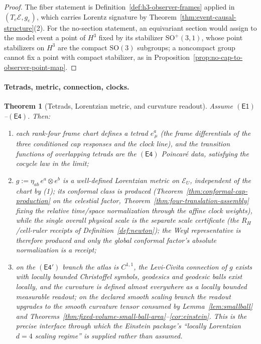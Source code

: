 \documentclass[11pt]{article}
\newtheorem{theorem}{Theorem}[section]
\begin{document}
\begin{proof}
The fiber statement is Definition~\ref{def:h3-observer-frames} applied in
\((T_e\mathcal E,g_e)\), which carries Lorentz signature by
Theorem~\ref{thm:event-causal-structure}(2). For the no-section statement,
an equivariant section would assign to the model event a point of \(H^3\)
fixed by its stabilizer \(\mathrm{SO}^{+}(3,1)\), whose point stabilizers on
\(H^3\) are the compact \(\mathrm{SO}(3)\) subgroups; a noncompact group
cannot fix a point with compact stabilizer, as in
Proposition~\ref{prop:no-cap-to-observer-point-map}.
\end{proof}

\paragraph{Tetrads, metric, connection, clocks.}

\begin{theorem}[Tetrads, Lorentzian metric, and curvature readout]
\label{thm:event-tetrad-metric}
Assume \(\mathsf{(E1)}\)--\(\mathsf{(E4)}\). Then:
\begin{enumerate}[leftmargin=2em]
\item each rank-four frame chart defines a tetrad
\(e_{\,\mu}^{a}\) (the frame differentials of the three conditioned cap
responses and the clock line), and the transition functions of overlapping
tetrads are the \(\mathsf{(E4)}\) Poincar\'e data, satisfying the cocycle law
in the limit;
\item \(g:=\eta_{ab}\,e^{a}\otimes e^{b}\) is a well-defined Lorentzian metric
on \(\mathcal E_U\), independent of the chart by (1); its conformal class is
produced (Theorem~\ref{thm:conformal-cap-production} on the celestial factor,
Theorem~\ref{thm:four-translation-assembly} fixing the relative time/space
normalization through the affine clock weights), while the single overall
physical scale is the separate scale certificate
(the \(R_H\)/cell-ruler receipts of Definition~\ref{def:newton}); the Weyl
representative is therefore produced and only the global conformal factor's
absolute normalization is a receipt;
\item on the \(\mathsf{(E4')}\) branch the atlas is \(C^{1,1}\), the
Levi-Civita connection of \(g\) exists with locally bounded Christoffel
symbols, geodesics and geodesic balls exist locally, and the curvature is
defined almost everywhere as a locally bounded measurable readout; on the
declared smooth scaling branch the readout upgrades to the smooth curvature
tensor consumed by Lemma~\ref{lem:smallball} and
Theorems~\ref{thm:fixed-volume-small-ball-area}--\ref{cor:einstein}. This is
the precise interface through which the Einstein package's ``locally
Lorentzian \(d=4\) scaling regime'' is supplied rather than assumed.
\end{enumerate}
\end{theorem}
\end{document}

